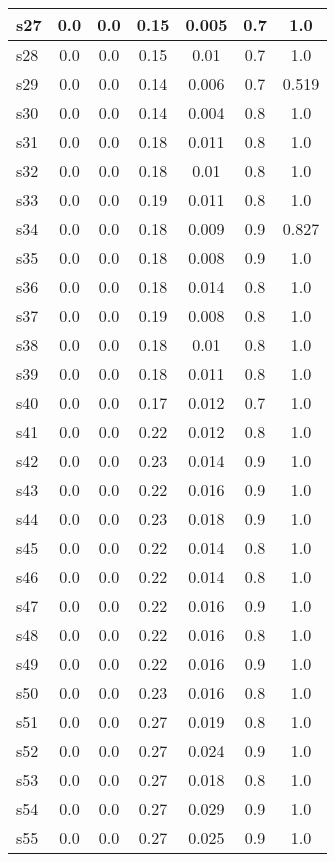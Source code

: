 \documentclass{article}
\begin{document}
\begin{tabular}{|l|c|c|c|c|c|c|}
\hline
s27 &0.0 & 0.0 & 0.15 & 0.005 & 0.7 & 1.0\\
\hline
s28 &0.0 & 0.0 & 0.15 & 0.01 & 0.7 & 1.0\\
\hline
s29 &0.0 & 0.0 & 0.14 & 0.006 & 0.7 & 0.519\\
\hline
s30 &0.0 & 0.0 & 0.14 & 0.004 & 0.8 & 1.0\\
\hline
s31 &0.0 & 0.0 & 0.18 & 0.011 & 0.8 & 1.0\\
\hline
s32 &0.0 & 0.0 & 0.18 & 0.01 & 0.8 & 1.0\\
\hline
s33 &0.0 & 0.0 & 0.19 & 0.011 & 0.8 & 1.0\\
\hline
s34 &0.0 & 0.0 & 0.18 & 0.009 & 0.9 & 0.827\\
\hline
s35 &0.0 & 0.0 & 0.18 & 0.008 & 0.9 & 1.0\\
\hline
s36 &0.0 & 0.0 & 0.18 & 0.014 & 0.8 & 1.0\\
\hline
s37 &0.0 & 0.0 & 0.19 & 0.008 & 0.8 & 1.0\\
\hline
s38 &0.0 & 0.0 & 0.18 & 0.01 & 0.8 & 1.0\\
\hline
s39 &0.0 & 0.0 & 0.18 & 0.011 & 0.8 & 1.0\\
\hline
s40 &0.0 & 0.0 & 0.17 & 0.012 & 0.7 & 1.0\\
\hline
s41 &0.0 & 0.0 & 0.22 & 0.012 & 0.8 & 1.0\\
\hline
s42 &0.0 & 0.0 & 0.23 & 0.014 & 0.9 & 1.0\\
\hline
s43 &0.0 & 0.0 & 0.22 & 0.016 & 0.9 & 1.0\\
\hline
s44 &0.0 & 0.0 & 0.23 & 0.018 & 0.9 & 1.0\\
\hline
s45 &0.0 & 0.0 & 0.22 & 0.014 & 0.8 & 1.0\\
\hline
s46 &0.0 & 0.0 & 0.22 & 0.014 & 0.8 & 1.0\\
\hline
s47 &0.0 & 0.0 & 0.22 & 0.016 & 0.9 & 1.0\\
\hline
s48 &0.0 & 0.0 & 0.22 & 0.016 & 0.8 & 1.0\\
\hline
s49 &0.0 & 0.0 & 0.22 & 0.016 & 0.9 & 1.0\\
\hline
s50 &0.0 & 0.0 & 0.23 & 0.016 & 0.8 & 1.0\\
\hline
s51 &0.0 & 0.0 & 0.27 & 0.019 & 0.8 & 1.0\\
\hline
s52 &0.0 & 0.0 & 0.27 & 0.024 & 0.9 & 1.0\\
\hline
s53 &0.0 & 0.0 & 0.27 & 0.018 & 0.8 & 1.0\\
\hline
s54 &0.0 & 0.0 & 0.27 & 0.029 & 0.9 & 1.0\\
\hline
s55 &0.0 & 0.0 & 0.27 & 0.025 & 0.9 & 1.0\\

\end{tabular}
\end{document}

